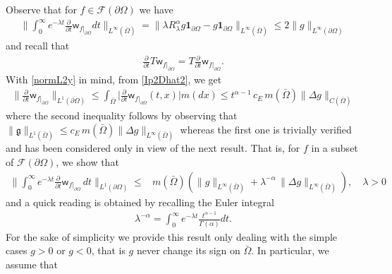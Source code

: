 \documentclass[11pt,a4paper]{article}
\begin{document}
Observe that for $f \in \mathcal{F}(\partial \Omega)$ we have
\begin{align*}
\Big\| \int_0^\infty e^{-\lambda t}  \frac{\partial}{\partial t}  \mathsf{w}_{f|_{\partial \Omega}} dt \Big\|_{L^\infty(\bar{\Omega})} = \| \lambda R^\alpha_\lambda g \mathbf{1}_{\partial \Omega} - g \mathbf{1}_{\partial \Omega} \|_{L^\infty(\bar{\Omega})} \leq 2\| g \|_{L^\infty(\partial \Omega)}
\end{align*}
and recall that 
\begin{align*}
\frac{\partial}{\partial t} T \mathsf{w}_{f|_{\partial \Omega}} = T \frac{\partial}{\partial t}  \mathsf{w}_{f|_{\partial \Omega}}.
\end{align*}
With \eqref{normL2y} in mind, from \eqref{Ip2Dhat2}, we get
\begin{align}
\Big\| \frac{\partial}{\partial t} \mathsf{w}_{f|_{\partial \Omega}} \Big\|_{L^1(\partial \Omega)} \leq \int_{\bar{\Omega}} \Big| \frac{\partial}{\partial t} \mathsf{w}_{f|_{\partial \Omega}}(t, x) \Big| m(dx) \leq t^{\alpha -1}  \, c_E\,  m(\bar{\Omega}) \| \Delta g \|_{C(\bar{\Omega})}
\label{boundL1timeDer}
\end{align}
where the second inequality follows by observing that $\|\mathfrak{g} \|_{L^1(\bar{\Omega})} \leq c_E\, m(\bar{\Omega}) \| \Delta g \|_{L^\infty (\bar{\Omega})}$ whereas the first one is trivially verified and has been considered only in view of the next result. That is, for $f$ in a subset of $\mathcal{F}(\partial \Omega)$, we show that
\begin{align}
\Big\| \int_0^\infty  e^{-\lambda t} \frac{\partial}{\partial t} \mathsf{w}_{f|_{\partial \Omega}} \, dt \Big\|_{L^1(\partial \Omega)} \leq & m(\bar{\Omega}) \left( \| g\|_{L^\infty(\bar{\Omega})} + \lambda^{-\alpha}\,  \| \Delta g \|_{L^\infty (\bar{\Omega})} \right), \quad \lambda>0
\label{IpDhat1}
\end{align}
and a quick reading is obtained by recalling the Euler integral
\begin{align*}
\lambda^{-\alpha} = \int_0^\infty e^{-\lambda t} \frac{t^{\alpha-1}}{\Gamma(\alpha)} dt.
\end{align*}
For the sake of simplicity we provide this result only dealing with the simple cases $g>0$ or $g<0$, that is $g$ never change its sign on $\bar{\Omega}$. In particular, we assume that
\end{document}
